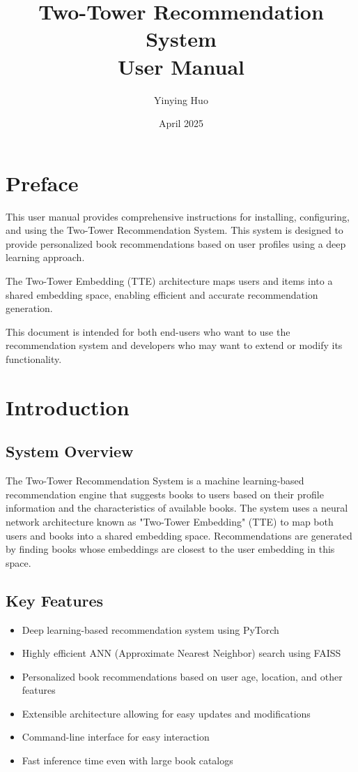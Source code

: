\documentclass[12pt, a4paper, oneside]{book}
\title{
    \textbf{Two-Tower Recommendation System}\\
    \large User Manual
}
\author{Yinying Huo}
\date{April 2025}
\begin{document}
\frontmatter
\maketitle

\tableofcontents

\chapter*{Preface}

This user manual provides comprehensive instructions for installing, configuring, and using the Two-Tower Recommendation System. This system is designed to provide personalized book recommendations based on user profiles using a deep learning approach.

The Two-Tower Embedding (TTE) architecture maps users and items into a shared embedding space, enabling efficient and accurate recommendation generation.

This document is intended for both end-users who want to use the recommendation system and developers who may want to extend or modify its functionality.

\mainmatter

\chapter{Introduction}

\section{System Overview}
The Two-Tower Recommendation System is a machine learning-based recommendation engine that suggests books to users based on their profile information and the characteristics of available books. The system uses a neural network architecture known as "Two-Tower Embedding" (TTE) to map both users and books into a shared embedding space. Recommendations are generated by finding books whose embeddings are closest to the user embedding in this space.

\section{Key Features}
\begin{itemize}
    \item Deep learning-based recommendation system using PyTorch
    \item Highly efficient ANN (Approximate Nearest Neighbor) search using FAISS
    \item Personalized book recommendations based on user age, location, and other features
    \item Extensible architecture allowing for easy updates and modifications
    \item Command-line interface for easy interaction
    \item Fast inference time even with large book catalogs
\end{itemize}
\end{document}

